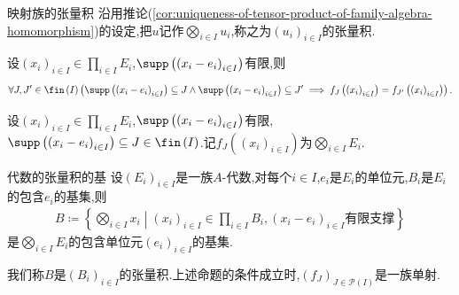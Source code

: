 \begin{definition}{映射族的张量积}{}
	沿用推论(\ref{cor:uniqueness-of-tensor-product-of-family-algebra-homomorphism})的设定,把$u$记作$\bigotimes\limits_{i\in I}u_{i}$,称之为$\left(u_{i}\right)_{i\in I}$的张量积.
\end{definition}

\begin{remark}{}{}
	设$\left(x_{i}\right)_{i\in I}\in\prod\limits_{i\in I}E_{i}$,$\supp\left(\left(x_{i}-e_{i}\right)_{i\in I}\right)$有限,则
	\begin{align*}
		\forall J,J^{\prime}\in\fin\left(I\right)\left(\supp\left(\left(x_{i}-e_{i}\right)_{i\in I}\right)\subseteq J\wedge\supp\left(\left(x_{i}-e_{i}\right)_{i\in I}\right)\subseteq J^{\prime}\implies f_{J}\left(\left(x_{i}\right)_{i\in I}\right)=f_{J^{\prime}}\left(\left(x_{i}\right)_{i\in I}\right)\right).
	\end{align*}
\end{remark}

\begin{definition}{}{}
	设$\left(x_{i}\right)_{i\in I}\in\prod\limits_{i\in I}E_{i}$,$\supp\left(\left(x_{i}-e_{i}\right)_{i\in I}\right)$有限,$\supp\left(\left(x_{i}-e_{i}\right)_{i\in I}\right)\subseteq J\in\fin\left(I\right)$.记$f_{J}\left(\left(x_{i}\right)_{i\in I}\right)$为$\bigotimes\limits_{i\in I}E_{i}$.
\end{definition}

\begin{proposition}{代数的张量积的基}{}
	设$\left(E_{i}\right)_{i\in I}$是一族$A$-代数,对每个$i\in I$,$e_{i}$是$E_{i}$的单位元,$B_{i}$是$E_{i}$的包含$e_{i}$的基集,则
	\begin{align*}
		B\coloneq\left\{\bigotimes\limits_{i\in I}x_{i}\middle|\left(x_{i}\right)_{i\in I}\in\prod\limits_{i\in I}B_{i},\left(x_{i}-e_{i}\right)_{i\in I}\text{有限支撑}\right\}
	\end{align*}
	是$\bigotimes\limits_{i\in I}E_{i}$的包含单位元$\left(e_{i}\right)_{i\in I}$的基集.
\end{proposition}

\begin{remark}{}{}
	我们称$B$是$\left(B_{i}\right)_{i\in I}$的张量积.上述命题的条件成立时,$\left(f_{J}\right)_{J\in\mathcal{P}\left(I\right)}$是一族单射.
\end{remark}









































